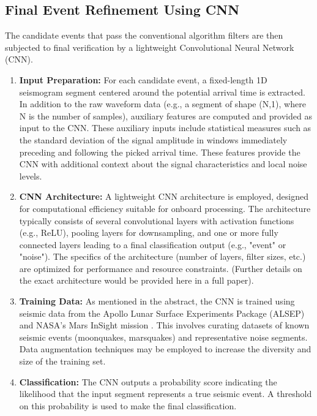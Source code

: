 \documentclass[conference]{IEEEtran}
\begin{document}
\subsection{Final Event Refinement Using CNN}
The candidate events that pass the conventional algorithm filters are then subjected to final verification by a lightweight Convolutional Neural Network (CNN).
\begin{enumerate}
    \item \textbf{Input Preparation:} For each candidate event, a fixed-length 1D seismogram segment centered around the potential arrival time is extracted. In addition to the raw waveform data (e.g., a segment of shape (N,1), where N is the number of samples), auxiliary features are computed and provided as input to the CNN. These auxiliary inputs include statistical measures such as the standard deviation of the signal amplitude in windows immediately preceding and following the picked arrival time. These features provide the CNN with additional context about the signal characteristics and local noise levels.
    \item \textbf{CNN Architecture:} A lightweight CNN architecture is employed, designed for computational efficiency suitable for onboard processing. The architecture typically consists of several convolutional layers with activation functions (e.g., ReLU), pooling layers for downsampling, and one or more fully connected layers leading to a final classification output (e.g., "event" or "noise"). The specifics of the architecture (number of layers, filter sizes, etc.) are optimized for performance and resource constraints. (Further details on the exact architecture would be provided here in a full paper).
    \item \textbf{Training Data:} As mentioned in the abstract, the CNN is trained using seismic data from the Apollo Lunar Surface Experiments Package (ALSEP) \cite{b11} and NASA’s Mars InSight mission \cite{b12}. This involves curating datasets of known seismic events (moonquakes, marsquakes) and representative noise segments. Data augmentation techniques may be employed to increase the diversity and size of the training set.
    \item \textbf{Classification:} The CNN outputs a probability score indicating the likelihood that the input segment represents a true seismic event. A threshold on this probability is used to make the final classification.
\end{enumerate}
\end{document}
